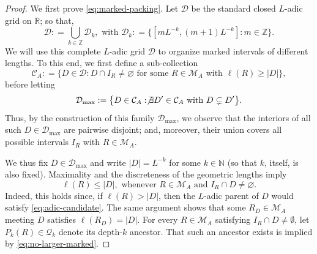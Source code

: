 \documentclass[12pt]{amsart}
\numberwithin{equation}{section}
\begin{document}
\begin{proof}
We first prove \eqref{eq:marked-packing}.  Let $\mathcal D$ be the standard closed $L$-adic grid on $\mathbb R$; so that,
$$
\mathcal{D} : = \bigcup_{k \in \mathbb{Z}} \mathcal{D}_k, \textrm{ with } \mathcal{D}_k : = \big\{[m L^{-k}, (m+1) L^{-k}] : m \in \mathbb{Z} \big\}.
$$
We will use this complete $L$-adic grid $\mathcal{D}$ to organize marked intervals of different lengths.  To this end, we first define a sub-collection
\begin{equation}\label{eq:adic-candidate}
\mathcal{C}_A : = \big\{D\in\mathcal D:D\cap I_R\neq\varnothing
 \text{ for some }R\in\mathscr M_A\text{ with }\ell(R)\geq|D| \big\},
\end{equation}
before letting
\begin{equation}\label{eq:maximal-adic}
\mathcal D_{\max} : = \big\{D \in \mathcal{C}_A : \not\exists D' \in \mathcal{C}_A \textrm{ with }  D \subsetneq D' \big\}.
\end{equation}
Thus, by the construction of this family $\mathcal{D}_{\max}$, we observe that the interiors of all such $D \in \mathcal{D}_{\max}$ are pairwise disjoint; and, moreover, their union covers all possible intervals $I_R$ with $R \in \mathscr{M}_A$.

We thus fix $D\in\mathcal D_{\max}$ and write $|D|=L^{-k}$ for some $k \in \mathbb{N}$ (so that $k$, itself, is also fixed).  Maximality and the discreteness of the geometric lengths imply
\begin{equation}\label{eq:no-larger-marked}
 \ell(R)\leq|D|,
 \text{ whenever }R\in\mathscr M_A\text{ and }I_R\cap D\neq\varnothing.
\end{equation}
Indeed, this holds since, if $\ell(R)>|D|$, then the $L$-adic parent of $D$ would satisfy \eqref{eq:adic-candidate}. The same argument shows that some $R_D\in\mathscr M_A$ meeting $D$ satisfies $\ell(R_D)=|D|$. For every $R\in\mathscr M_A$ satisfying $I_R \cap D \neq \emptyset$, let $P_k(R)\in\mathscr Q_k$ denote its depth-$k$ ancestor. That such an ancestor exists is implied by \eqref{eq:no-larger-marked}. 


\end{proof}
\end{document}
